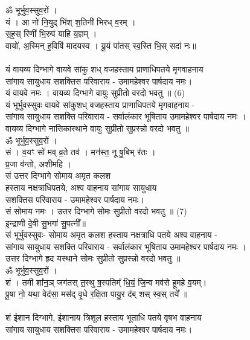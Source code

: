 ॐ भूर्भुव॒स्सुव॒रों ।\\
यं । आ नो॑ नि॒युद् भि॑श् श॒तिनी॑ भिरध् व॒रम् । \\
स॒ह॒स् रिणी॑ भि॒रुप॑ याहि य॒ज्ञम् ।\\
वायो॑, अ॒स्मिन् ह॒विषि॑ मादयस्व । यू॒यं पा॑तस् स्व॒स्ति भि॒स् सदा॑ नः॥\\
\\
यं वायव्य दिग्भागे वायवे सांकु शध् वजहस्ताय प्राणाधिपतये मृगवाहनाय\\
सांगाय सायुधाय सशक्तिस परिवाराय -  उमामहेश्वर पार्षदाय नमः।\\
यं वायवे नमः । वायव्य दिग्भागे  वायुः सुप्रीतो  वरदो भवतु ॥ (6)\\
{\small यं भूर्भुवस्सुवः वायवे सांकुशध् वजहस्ताय प्राणाधिपतये मृगवाहनाय -\\
सांगाय सायुधाय सशक्ति परिवाराय - सर्वालंकार भूषिताय उमामहेश्वर पार्षदाय नमः ।\\
वायव्य दिग्भागे नासिकास्थाने वायुः सुप्रीतो सुप्रस्न्नो वरदो भवतु ॥}\\
ॐ भूर्भुव॒स्सुव॒रों ।\\
सं । व॒यꣳ सो॑ मव् व्र॒ते तव॑ । मन॑स्त॒ नू षु॒बिभ् र॑तः ।\\
प्र॒जा व॑न्तो, अशीमहि ।\\
सं उत्तर दिग्भागे सोमाय अमृत कलश \\
हस्ताय नक्षत्राधिपतये, अश्व वाहनाय सांगाय सायुधाय \\
सशक्तिस परिवाराय - उमामहेश्वर पार्षदाय नमः।\\
सं सोमाय नमः । उत्तर दिग्भागे  सोमः सुप्रीतो वरदो भवतु ॥ (7)\\
{\small इ॒न्द्राणी दे॒वी सु॒भगा॑ सु॒पत्नी᳚॥\\
सं भूर्भुवस्सुवः- सोमाय अमृत कलश हस्ताय नक्षत्राधि पतये अश्व वाहनाय -\\
सांगाय सायुधाय सशक्ति परिवाराय - सर्वालंकार भूषिताय उमामहेश्वर पार्षदाय नमः ।\\
उत्तर दिग्भागे ह्रद यस्थाने सोमः सुप्रीतो सुप्रस्न्नो वरदो भवतु ॥}\\
ॐ भूर्भुव॒स्सुव॒रों ।\\
शं । तमी शा᳚न॒ञ् जग॑तस् त॒स्थु ष॒स्पतिम्᳚ धि॒यं॒ जि॒न्व मव॑से हूमहे व॒यम्।\\
पू॒षा नो॒ यथा॒ वेद॑सा॒ मस॑द् वृ॒धे र॒क्षि॒ता पायु॒र द॑ब् शस् स्व॒स् तये᳚ ॥\\
\\
शं ईशान दिग्भागे, ईशानाय त्रिशूल हस्ताय भूताधि पतये वृषभ वाहनाय\\
सांगाय सायुधाय सशक्तिस परिवाराय -  उमामहेश्वर पार्षदाय नमः।\\
